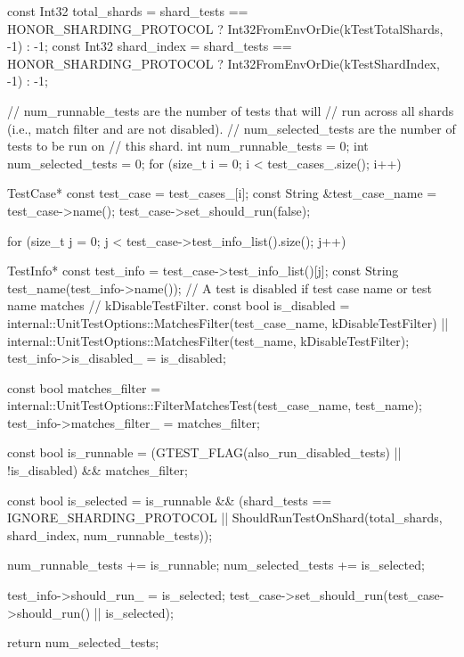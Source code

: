 \begin{DoxyCode}
                                                            {
  const Int32 total_shards = shard_tests == HONOR_SHARDING_PROTOCOL ?
      Int32FromEnvOrDie(kTestTotalShards, -1) : -1;
  const Int32 shard_index = shard_tests == HONOR_SHARDING_PROTOCOL ?
      Int32FromEnvOrDie(kTestShardIndex, -1) : -1;

  // num_runnable_tests are the number of tests that will
  // run across all shards (i.e., match filter and are not disabled).
  // num_selected_tests are the number of tests to be run on
  // this shard.
  int num_runnable_tests = 0;
  int num_selected_tests = 0;
  for (size_t i = 0; i < test_cases_.size(); i++) {
    TestCase* const test_case = test_cases_[i];
    const String &test_case_name = test_case->name();
    test_case->set_should_run(false);

    for (size_t j = 0; j < test_case->test_info_list().size(); j++) {
      TestInfo* const test_info = test_case->test_info_list()[j];
      const String test_name(test_info->name());
      // A test is disabled if test case name or test name matches
      // kDisableTestFilter.
      const bool is_disabled =
          internal::UnitTestOptions::MatchesFilter(test_case_name,
                                                   kDisableTestFilter) ||
          internal::UnitTestOptions::MatchesFilter(test_name,
                                                   kDisableTestFilter);
      test_info->is_disabled_ = is_disabled;

      const bool matches_filter =
          internal::UnitTestOptions::FilterMatchesTest(test_case_name,
                                                       test_name);
      test_info->matches_filter_ = matches_filter;

      const bool is_runnable =
          (GTEST_FLAG(also_run_disabled_tests) || !is_disabled) &&
          matches_filter;

      const bool is_selected = is_runnable &&
          (shard_tests == IGNORE_SHARDING_PROTOCOL ||
           ShouldRunTestOnShard(total_shards, shard_index,
                                num_runnable_tests));

      num_runnable_tests += is_runnable;
      num_selected_tests += is_selected;

      test_info->should_run_ = is_selected;
      test_case->set_should_run(test_case->should_run() || is_selected);
    }
  }
  return num_selected_tests;
}
\end{DoxyCode}
